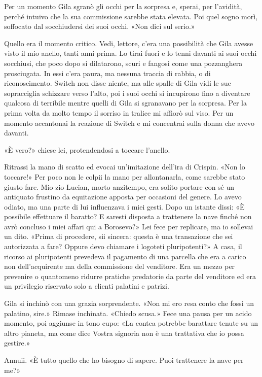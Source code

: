 Per un momento Gila sgranò gli occhi per la sorpresa e, sperai, per
l'avidità, perché intuivo che la sua commissione sarebbe stata elevata.
Poi quel sogno morì, soffocato dal socchiudersi dei suoi occhi. «Non
dici sul serio.»

Quello era il momento critico. Vedi, lettore, c'era una possibilità che
Gila avesse visto il mio anello, tanti anni prima. Lo tirai fuori e lo
tenni davanti ai suoi occhi socchiusi, che poco dopo si dilatarono,
scuri e fangosi come una pozzanghera prosciugata. In essi c'era paura,
ma nessuna traccia di rabbia, o di riconoscimento. Switch non disse
niente, ma alle spalle di Gila vidi le sue sopracciglia schizzare verso
l'alto, poi i suoi occhi si incupirono fino a diventare qualcosa di
terribile mentre quelli di Gila si sgranavano per la sorpresa. Per la
prima volta da molto tempo il sorriso in tralice mi affiorò sul viso.
Per un momento accantonai la reazione di Switch e mi concentrai sulla
donna che avevo davanti.

«È vero?» chiese lei, protendendosi a toccare l'anello.

Ritrassi la mano di scatto ed evocai un'imitazione dell'ira di Crispin.
«Non lo toccare!» Per poco non le colpii la mano per allontanarla, come
sarebbe stato giusto fare. Mio zio Lucian, morto anzitempo, era solito
portare con sé un antiquato frustino da equitazione apposta per
occasioni del genere. Lo avevo odiato, ma una parte di lui influenzava i
miei gesti. Dopo un istante dissi: «È possibile effettuare il baratto? E
saresti disposta a trattenere la nave finché non avrò concluso i miei
affari qui a Borosevo?» Lei fece per replicare, ma io sollevai un dito.
«Prima di procedere, sii sincera: questa è una transazione che sei
autorizzata a fare? Oppure devo chiamare i logoteti pluripotenti?» A
casa, il ricorso ai pluripotenti prevedeva il pagamento di una parcella
che era a carico non dell'acquirente ma della commissione del venditore.
Era un mezzo per prevenire o quantomeno ridurre pratiche predatorie da
parte del venditore ed era un privilegio riservato solo a clienti
palatini e patrizi.

Gila si inchinò con una grazia sorprendente. «Non mi ero resa conto che
fossi un palatino, sire.» Rimase inchinata. «Chiedo scusa.» Fece una
pausa per un acido momento, poi aggiunse in tono cupo: «La contea
potrebbe barattare tenute su un altro pianeta, ma come dice Vostra
signoria non è una trattativa che io possa gestire.»

Annuii. «È tutto quello che ho bisogno di sapere. Puoi trattenere la
nave per me?»

